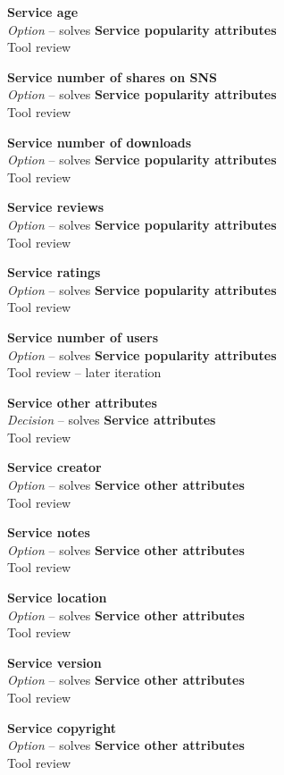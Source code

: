 \textbf{Service age} \\ \emph{Option} -- solves \textbf{Service popularity attributes} \\ Tool review

\textbf{Service number of shares on SNS} \\ \emph{Option} -- solves \textbf{Service popularity attributes} \\ Tool review

\textbf{Service number of downloads} \\ \emph{Option} -- solves \textbf{Service popularity attributes} \\ Tool review

\textbf{Service reviews} \\ \emph{Option} -- solves \textbf{Service popularity attributes} \\ Tool review

\textbf{Service ratings} \\ \emph{Option} -- solves \textbf{Service popularity attributes} \\ Tool review

\textbf{Service number of users} \\ \emph{Option} -- solves \textbf{Service popularity attributes} \\ Tool review  -- later iteration

\textbf{Service other attributes} \\ \emph{Decision} -- solves \textbf{Service attributes} \\ Tool review

\textbf{Service creator} \\ \emph{Option} -- solves \textbf{Service other attributes} \\ Tool review

\textbf{Service notes} \\ \emph{Option} -- solves \textbf{Service other attributes} \\ Tool review

\textbf{Service location} \\ \emph{Option} -- solves \textbf{Service other attributes} \\ Tool review

\textbf{Service version} \\ \emph{Option} -- solves \textbf{Service other attributes} \\ Tool review

\textbf{Service copyright} \\ \emph{Option} -- solves \textbf{Service other attributes} \\ Tool review

